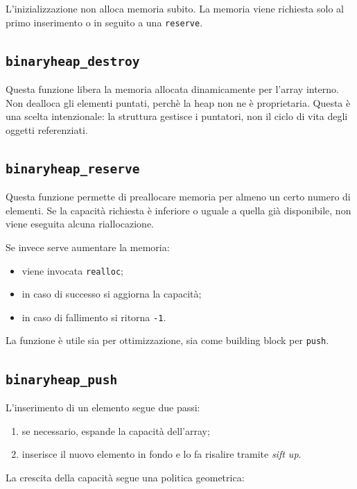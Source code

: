 \documentclass[a4paper,12pt]{article}
\begin{document}
L'inizializzazione non alloca memoria subito. La memoria viene richiesta solo al primo inserimento o in seguito a una \texttt{reserve}.

\subsection{\texttt{binaryheap\_destroy}}

Questa funzione libera la memoria allocata dinamicamente per l'array interno. Non dealloca gli elementi puntati, perchè la heap non ne è proprietaria. Questa è una scelta intenzionale: la struttura gestisce i puntatori, non il ciclo di vita degli oggetti referenziati.

\subsection{\texttt{binaryheap\_reserve}}

Questa funzione permette di preallocare memoria per almeno un certo numero di elementi. Se la capacità richiesta è inferiore o uguale a quella già disponibile, non viene eseguita alcuna riallocazione.

Se invece serve aumentare la memoria:

\begin{itemize}[leftmargin=*]
    \item viene invocata \texttt{realloc};
    \item in caso di successo si aggiorna la capacità;
    \item in caso di fallimento si ritorna \texttt{-1}.
\end{itemize}

La funzione è utile sia per ottimizzazione, sia come building block per \texttt{push}.

\subsection{\texttt{binaryheap\_push}}

L'inserimento di un elemento segue due passi:

\begin{enumerate}[leftmargin=*]
    \item se necessario, espande la capacità dell'array;
    \item inserisce il nuovo elemento in fondo e lo fa risalire tramite \emph{sift up}.
\end{enumerate}

La crescita della capacità segue una politica geometrica:
\end{document}
